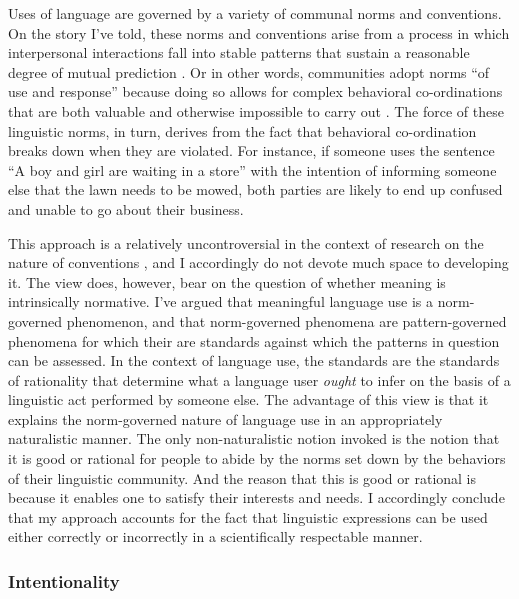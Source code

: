 Uses of language are governed by a variety of communal norms and conventions. On the story I've told, these norms and conventions arise from a process in which interpersonal interactions fall into stable patterns that sustain a reasonable degree of mutual prediction \citep{clark:2013}. Or in other words, communities adopt norms ``of use and response'' because doing so allows for complex behavioral co-ordinations that are both valuable and otherwise impossible to carry out \citep[][p. 50]{Millikan:2005}. The force of these linguistic norms, in turn, derives from the fact that behavioral co-ordination breaks down when they are violated. For instance, if someone uses the sentence ``A boy and girl are waiting in a store'' with the intention of informing someone else that the lawn needs to be mowed, both parties are likely to end up confused and unable to go about their business.

This approach is a relatively uncontroversial in the context of research on the nature of conventions \citep{Millikan:2005,Lewis:1975,Lewis:1969}, and I accordingly do not devote much space to developing it. The view does, however, bear on the question of whether meaning is intrinsically normative. I've argued that meaningful language use is a norm-governed phenomenon, and that norm-governed phenomena are pattern-governed phenomena for which their are standards against which the patterns in question can be assessed. In the context of language use, the standards are the standards of rationality that determine what a language user \textit{ought} to infer on the basis of a linguistic act performed by someone else. The advantage of this view is that it explains the norm-governed nature of language use in an appropriately naturalistic manner. The only non-naturalistic notion invoked is the notion that it is good or rational for people to abide by the norms set down by the behaviors of their linguistic community. And the reason that this is good or rational is because it enables one to satisfy their interests and needs. I accordingly conclude that my approach accounts for the fact that linguistic expressions can be used either correctly or incorrectly in a scientifically respectable manner. 

\subsubsection{Intentionality}

